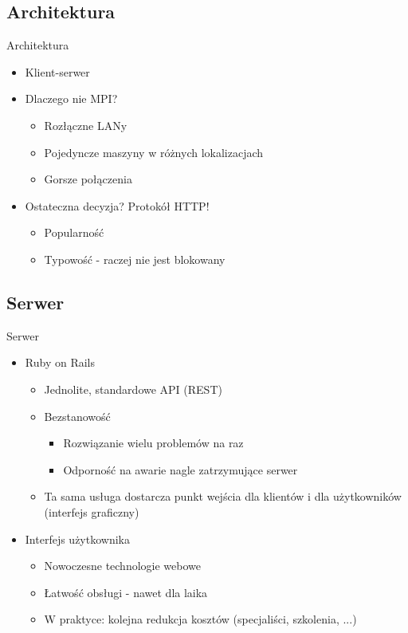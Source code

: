 \documentclass[12pt]{beamer}
\begin{document}
\subsection{Architektura}
\begin{frame}{Architektura}
\begin{itemize}
	\item Klient-serwer
	\item Dlaczego nie MPI?
	\begin{itemize}
		\item Rozłączne LANy
		\item Pojedyncze maszyny w różnych lokalizacjach
		\item Gorsze połączenia
	\end{itemize}
	\item Ostateczna decyzja? Protokół HTTP!
	\begin{itemize}
		\item Popularność
		\item Typowość - raczej nie jest blokowany
	\end{itemize}
\end{itemize}
\end{frame}

\subsection{Serwer}
\begin{frame}{Serwer}
\begin{itemize}
	\item Ruby on Rails
	\begin{itemize}
		\item Jednolite, standardowe API (REST)
		\item Bezstanowość
		\begin{itemize}
		\item Rozwiązanie wielu problemów na raz
		\item Odporność na awarie nagle zatrzymujące serwer
		\end{itemize}
		\item Ta sama usługa dostarcza punkt wejścia dla klientów i dla użytkowników (interfejs graficzny)
	\end{itemize}
	\item Interfejs użytkownika
	\begin{itemize}
		\item Nowoczesne technologie webowe
		\item Łatwość obsługi - nawet dla laika
		\item W praktyce: kolejna redukcja kosztów (specjaliści, szkolenia, ...)
	\end{itemize}
\end{itemize}
\end{frame}
\end{document}
